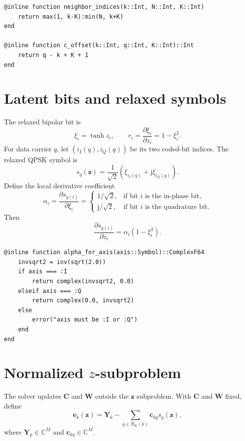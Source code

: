 \documentclass[11pt]{article}
\newcommand{\C}{\mathbb{C}}
\newcommand{\jj}{\mathrm{j}}
\begin{document}
\begin{lstlisting}
@inline function neighbor_indices(k::Int, N::Int, K::Int)
    return max(1, k-K):min(N, k+K)
end

@inline function c_offset(k::Int, q::Int, K::Int)::Int
    return q - k + K + 1
end
\end{lstlisting}

\section{Latent bits and relaxed symbols}

The relaxed bipolar bit is
\begin{equation}
\xi_i=\tanh z_i,
\qquad
r_i=\frac{\partial \xi_i}{\partial z_i}=1-\xi_i^2.
\end{equation}
For data carrier $q$, let $(i_I(q),i_Q(q))$ be its two coded-bit indices.  The relaxed QPSK symbol is
\begin{equation}
 s_q(\bm z)=\frac{1}{\sqrt2}\left(\xi_{i_I(q)}+\jj\xi_{i_Q(q)}\right).
\end{equation}
Define the local derivative coefficient
\begin{equation}
\alpha_i=\frac{\partial s_{q(i)}}{\partial \xi_i}
=\begin{cases}
1/\sqrt2, & \text{if bit }i\text{ is the in-phase bit},\\
\jj/\sqrt2, & \text{if bit }i\text{ is the quadrature bit}.
\end{cases}
\end{equation}
Then
\begin{equation}
\frac{\partial s_{q(i)}}{\partial z_i}=\alpha_i(1-\xi_i^2).
\end{equation}

\begin{lstlisting}
@inline function alpha_for_axis(axis::Symbol)::ComplexF64
    invsqrt2 = inv(sqrt(2.0))
    if axis === :I
        return complex(invsqrt2, 0.0)
    elseif axis === :Q
        return complex(0.0, invsqrt2)
    else
        error("axis must be :I or :Q")
    end
end
\end{lstlisting}

\section{Normalized $z$-subproblem}
\label{sec:z-subproblem}

The solver updates $\mathbf C$ and $\mathbf W$ outside the $\bm z$ subproblem.  With $\mathbf C$ and $\mathbf W$ fixed, define
\begin{equation}
\mathbf e_k(\bm z)
=\mathbf Y_k-\sum_{q\in\mathcal B_K(k)}\mathbf c_{kq}s_q(\bm z),
\end{equation}
where $\mathbf Y_k\in\C^M$ and $\mathbf c_{kq}\in\C^M$.
\end{document}
